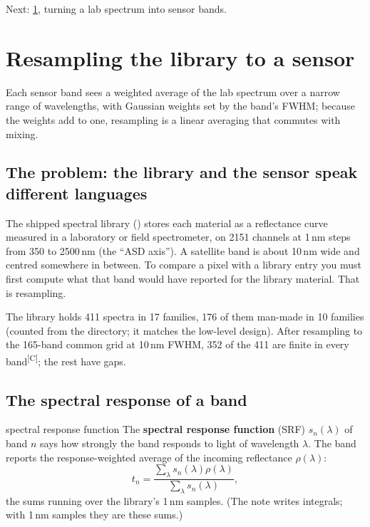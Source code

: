 \documentclass[11pt,a4paper,oneside,openany]{book}
\newcommand{\comp}{\textsuperscript{\textsf{\scriptsize[C]}}}
\newcommand{\nextchapter}[1]{\par\medskip\noindent\hfill\textsf{\small Next: #1}\par}
\begin{document}
\nextchapter{\cref{ch:resample}, turning a lab spectrum into sensor bands.}

\chapter{Resampling the library to a sensor}
\label{ch:resample}

\begin{onething}
Each sensor band sees a weighted average of the lab spectrum over a narrow range of wavelengths, with Gaussian weights set by the
band's FWHM; because the weights add to one, resampling is a linear averaging that commutes with mixing.
\end{onething}

\section{The problem: the library and the sensor speak different languages}

The shipped spectral library () stores each material as a reflectance curve measured in a laboratory
or field spectrometer, on 2151 channels at 1\,nm steps from 350 to 2500\,nm (the ``ASD axis''). A satellite band is about
10\,nm wide and centred somewhere in between. To compare a pixel with a library entry you must first compute what that band would
have reported for the library material. That is resampling.

The library holds 411 spectra in 17 families, 176 of them man-made in 10 families (counted from the directory; it matches the
low-level design). After resampling to the 165-band common grid at 10\,nm FWHM, 352 of the 411 are finite in every band\comp; the
rest have gaps.

\section{The spectral response of a band}

\begin{defn}{spectral response function}
The \textbf{spectral response function} (SRF) $s_n(\lambda)$ of band $n$ says how strongly the band responds to light of wavelength
$\lambda$. The band reports the response-weighted average of the incoming reflectance $\rho(\lambda)$:
\[
  t_n=\frac{\sum_\lambda s_n(\lambda)\rho(\lambda)}{\sum_\lambda s_n(\lambda)} ,
\]
the sums running over the library's 1\,nm samples. (The note writes integrals; with 1\,nm samples they are these sums.)
\end{defn}
\end{document}
